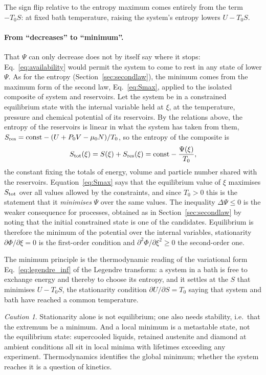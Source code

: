 \documentclass[10pt,a4paper]{article}
\theoremstyle{remark}
\newtheorem*{warning}{Caution}
\begin{document}
The sign flip relative to the entropy maximum comes entirely from the term
$-T_0S$: at fixed bath temperature, raising the system's entropy lowers
$U-T_0S$.

\paragraph{From ``decreases'' to ``minimum''.} That $\Psi$ can only decrease
does not by itself say where it stops: Eq.~\eqref{eq:availability} would permit
the system to come to rest in any state of lower $\Psi$. As for the entropy
(Section~\ref{sec:secondlaw}), the minimum comes from the maximum form of the
second law, Eq.~\eqref{eq:Smax}, applied to the isolated composite of system and
reservoirs. Let the system be in a constrained equilibrium state with the
internal variable held at $\xi$, at the temperature, pressure and chemical
potential of its reservoirs. By the relations above, the entropy of the
reservoirs is linear in what the system has taken from them,
$S_{\rm res}=\text{const}-(U+P_0V-\mu_0N)/T_0$, so the entropy of the composite is
\[
  S_{\rm tot}(\xi)=S(\xi)+S_{\rm res}(\xi)=\text{const}-\frac{\Psi(\xi)}{T_0} ,
\]
the constant fixing the totals of energy, volume and particle number shared
with the reservoirs. Equation~\eqref{eq:Smax} says that the equilibrium value of
$\xi$ maximises $S_{\rm tot}$ over all values allowed by the constraints, and
since $T_0>0$ this is the statement that it \emph{minimises} $\Psi$ over the
same values. The inequality $\Delta\Psi\leq0$ is the weaker consequence for
processes, obtained as in Section~\ref{sec:secondlaw} by noting that the
initial constrained state is one of the candidates. Equilibrium is therefore the
minimum of the potential over the internal variables, stationarity
$\partial\Phi/\partial\xi=0$ is the first-order condition and
$\partial^{2}\Phi/\partial\xi^{2}\geq0$ the second-order one.

The minimum principle is the thermodynamic reading of the variational form
Eq.~\eqref{eq:legendre_inf} of the Legendre transform: a system in a bath is
free to exchange energy and thereby to choose its entropy, and it settles at
the $S$ that minimises $U-T_0S$, the stationarity condition
$\partial U/\partial S=T_0$ saying that system and bath have reached a common
temperature.

\begin{warning}
Stationarity alone is not equilibrium; one also needs stability, i.e.\ that the
extremum be a minimum. And a local minimum is a metastable state, not the
equilibrium state: supercooled liquids, retained austenite and diamond at
ambient conditions all sit in local minima with lifetimes exceeding any
experiment. Thermodynamics identifies the global minimum; whether the system
reaches it is a question of kinetics.
\end{warning}
\end{document}
